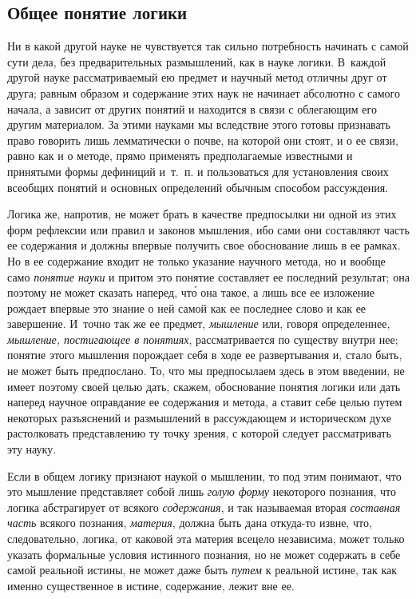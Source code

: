 \subsection[Общее понятие логики]{Общее понятие логики}
Ни в какой другой науке не чувствуется так
сильно потребность начинать с самой сути дела, без предварительных
размышлений, как в науке логики. В~каждой другой науке рассматриваемый ею
предмет и научный метод отличны друг от друга; равным образом и содержание
этих наук не начинает абсолютно с самого начала, а зависит от других
понятий и находится в связи с облегающим его другим материалом. За этими
науками мы вследствие этого готовы признавать право говорить лишь
лемматически о почве, на которой они стоят, и о ее связи, равно как и о
методе, прямо применять предполагаемые известными и
принятыми формы дефиниций и~т.~п. и пользоваться для установления своих
всеобщих понятий и основных определений обычным способом рассуждения.

Логика же, напротив, не может брать в качестве предпосылки ни одной из этих
форм рефлексии или правил и законов мышления, ибо сами они составляют часть
ее содержания и должны впервые получить свое обоснование лишь в ее рамках.
Но в ее содержание входит не только указание научного метода, но и вообще
само {\em понятие науки} и притом это понятие
составляет ее последний результат; она поэтому не может сказать наперед,
чт\'{о} она такое, а лишь все ее изложение рождает впервые это знание о ней
самой как ее последнее слово и как ее завершение. И~точно так же ее
предмет, {\em мышление} или, говоря определеннее,
{\em мышление, постигающее в понятиях}, рассматривается
по существу внутри нее; понятие этого мышления порождает себя в ходе ее
развертывания и, стало быть, не может быть предпослано. То, что мы
предпосылаем здесь в этом введении, не имеет поэтому своей целью дать,
скажем, обоснование понятия логики или дать наперед научное оправдание ее
содержания и метода, а ставит себе целью путем некоторых разъяснений и
размышлений в рассуждающем и историческом духе растолковать представлению
ту точку зрения, с которой следует рассматривать эту науку.

Если в общем логику признают наукой о мышлении, то под этим понимают, что
это мышление представляет собой лишь {\em голую форму}
некоторого познания, что логика абстрагирует от всякого
{\em содержания}, и так называемая вторая
{\em составная часть} всякого познания,
{\em материя}, должна быть дана откуда-то извне, что,
следовательно, логика, от каковой эта материя всецело независима, может
только указать формальные условия истинного познания, но не может содержать
в себе самой реальной истины, не может даже быть
{\em путем} к реальной истине, так как именно
существенное в истине, содержание, лежит вне ее.

